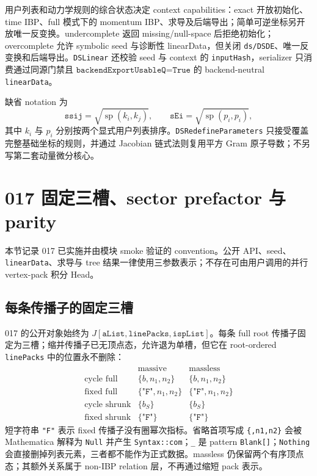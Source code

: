 ﻿\documentclass[a4paper,11pt]{article}
\begin{document}
用户列表和动力学规则的综合状态决定 context capabilities：exact 开放初始化、time IBP、full 模式下的 momentum IBP、求导及后端导出；简单可逆坐标另开放唯一反变换。undercomplete 返回 missing/null-space 后拒绝初始化；overcomplete 允许 symbolic seed 与诊断性 linearData，但关闭 \texttt{ds/DSDE}、唯一反变换和后端导出。\texttt{DSLinear} 还校验 seed 与 context 的 \texttt{inputHash}，serializer 只消费通过同源门禁且 $\texttt{backendExportUsableQ=True}$ 的 backend-neutral \texttt{linearData}。

缺省 notation 为
\begin{equation}
 \texttt{ssij}=\sqrt{\operatorname{sp}(k_i,k_j)},\qquad
 \texttt{sEi}=\sqrt{\operatorname{sp}(p_i,p_i)},
\end{equation}
其中 $k_i$ 与 $p_i$ 分别按两个显式用户列表排序。\texttt{DSRedefineParameters} 只接受覆盖完整基础坐标的规则，并通过 Jacobian 链式法则复用平方 Gram 原子导数；不另写第二套动量微分核心。

\section{017 固定三槽、sector prefactor 与 parity}

本节记录 017 已实施并由模块 smoke 验证的 convention。公开 API、seed、\texttt{linearData}、求导与 tree 结果一律使用三参数表示；不存在可由用户调用的并行 vertex-pack 积分 Head。

\subsection{每条传播子的固定三槽}

017 的公开对象始终为 $J[\texttt{aList},\texttt{linePacks},\texttt{ispList}]$。每条 full root 传播子固定为三槽；缩并传播子已无顶点态，允许退为单槽，但它在 root-ordered \texttt{linePacks} 中的位置永不删除：
\begin{equation}
 \begin{array}{c|cc}
 &\text{massive}&\text{massless}\\ \hline
 \text{cycle full}&\{b,n_1,n_2\}&\{b,n_1,n_2\}\\
 \text{fixed full}&\{\texttt{"F"},n_1,n_2\}&\{\texttt{"F"},n_1,n_2\}\\
 \text{cycle shrunk}&\{b_S\}&\{b_S\}\\
 \text{fixed shrunk}&\{\texttt{"F"}\}&\{\texttt{"F"}\}
 \end{array}
 \label{v017FixedThreeSlotSchema}
\end{equation}
短字符串 \texttt{"F"} 表示 fixed 传播子没有圈幂次指标。省略首项写成 \texttt{\{,n1,n2\}} 会被 Mathematica 解释为 \texttt{Null} 并产生 \texttt{Syntax::com}；\texttt{\_} 是 pattern \texttt{Blank[]}；\texttt{Nothing} 会直接删掉列表元素，三者都不能作为正式数据。massless 仍保留两个有序顶点态；其额外关系属于 non-IBP relation 层，不再通过缩短 pack 表示。
\end{document}
